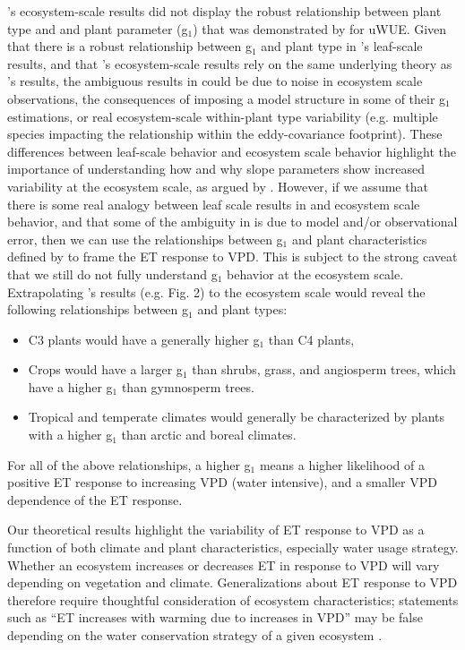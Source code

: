 \documentclass[draft]{agujournal2019}
\begin{document}
's ecosystem-scale results did not display the
robust relationship between plant type and and plant parameter (g$_1$)
that was demonstrated by  for uWUE. Given that there
is a robust relationship between g$_1$ and plant type in
's leaf-scale results, and that 's ecosystem-scale results
rely on the same underlying theory as 's results,
the ambiguous results in  could be due to noise in
ecosystem scale observations, the consequences of imposing a model
structure in some of their g$_1$ estimations, or real ecosystem-scale
within-plant type variability (e.g. multiple species impacting the
relationship within the eddy-covariance footprint). These differences
between leaf-scale behavior and ecosystem scale behavior highlight the
importance of understanding how and why slope parameters show
increased variability at the ecosystem scale, as argued by
. However, if we assume that there is some real
analogy between leaf scale results in  and ecosystem
scale behavior, and that some of the ambiguity in 
is due to model and/or observational error, then we can use the
relationships between g$_1$ and plant characteristics defined by
 to frame the ET response to VPD. This is subject to
the strong caveat that we still do not fully understand g$_1$ behavior
at the ecosystem scale. Extrapolating 's results
(e.g. Fig. 2) to the ecosystem scale would reveal the following
relationships between g$_1$ and plant types:

\begin{itemize}
  \item C3 plants would have a generally higher g$_1$ than C4 plants,
  \item Crops would have a larger g$_1$ than shrubs, grass, and
    angiosperm trees, which have a higher g$_1$ than gymnosperm
    trees.
  \item Tropical and temperate climates would generally be
    characterized by plants with a higher g$_1$ than arctic and boreal
    climates.
\end{itemize}
For all of the above relationships, a higher g$_1$ means a higher
likelihood of a positive ET response to increasing VPD (water
intensive), and a smaller VPD dependence of the ET response.

Our theoretical results highlight the variability of ET
response to VPD as a function of both climate  and plant
characteristics, especially water usage strategy. Whether an
ecosystem increases or decreases ET in response to VPD will vary
depending on vegetation and climate. Generalizations about ET response
to VPD therefore require thoughtful consideration of ecosystem
characteristics; statements such as ``ET increases with warming due to
increases in VPD'' may be false depending on the water conservation
strategy of a given ecosystem \cite{Lemordant_2018}.
\end{document}

